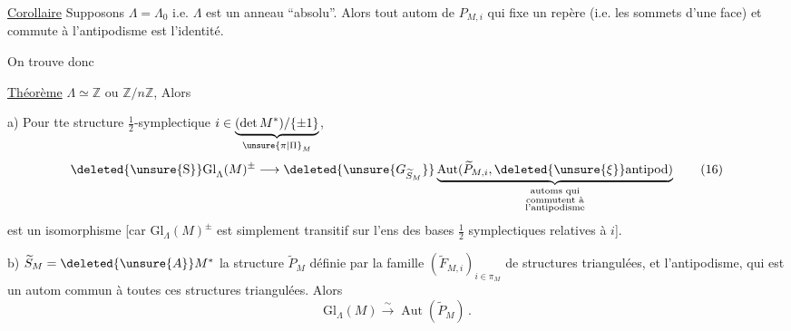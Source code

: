 \uline{Corollaire} Supposons $\Lambda=\Lambda_0$ i.e. $\Lambda$ est un anneau ``absolu''. Alors tout autom de $P_{M,i}$ qui fixe un repère (i.e. les sommets d'une face) et commute à l'antipodisme est l'identité.

On trouve donc

\uline{Théorème}  $\Lambda\simeq\mathbb Z$ ou $\mathbb Z/n\mathbb Z$,  Alors

a) Pour tte structure $\tfrac12$-symplectique $i\in\underbrace{(\det M^*)/\{\pm1\}}_{\unsure{\pi|\Pi}_M}$,  
\[
 \mathrm{\deleted{\unsure{S}}Gl}_\Lambda(M)^{\pm}\longrightarrow
 \deleted{\unsure{G_{\widetilde S_M}}}\underbrace{\operatorname{Aut}(\widetilde P_{M,i},\deleted{\unsure{\xi}}\mathrm{antipod})}_{\substack{\text{automs qui}\\\text{commutent à}\\\text{l'antipodisme}}}\tag*{(16)}
\]
 est un isomorphisme [car $\mathrm{Gl}_\Lambda(M)^{\pm}$ est simplement transitif sur l'ens des bases $\tfrac12$ symplectiques relatives à $i$].

b)  $\widetilde S_M=\deleted{\unsure{A}}M^*$ la structure $\widetilde P_M$ définie par la famille $(\widetilde F_{M,i})_{i\in\pi_M}$  de structures triangulées, et l'antipodisme, qui est un autom  commun à toutes ces structures triangulées. Alors
\[
 \mathrm{Gl}_\Lambda(M)\xrightarrow{\sim}\operatorname{Aut}(\widetilde P_M)\,.\tag*{(17)}
\]
